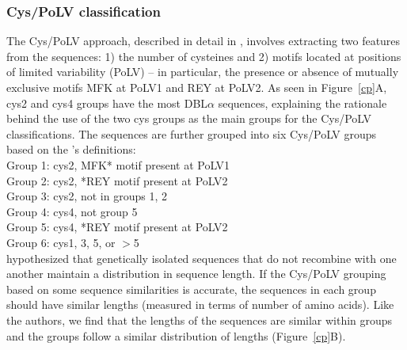 \documentclass[10pt,twocolumn,superscriptaddress]{revtex4-1}
\newcommand{\dbla}{{DBL$\alpha$}\xspace}
\newcommand{\cp}{{Cys/PoLV}\xspace}
\newcommand{\figdir}{figures/}
\begin{document}


\subsubsection{\cp classification}
The \cp approach, described in detail in \cite{bull2007}, involves extracting two features from the sequences: 1) the number of cysteines and 2) motifs located at positions of limited variability (PoLV) -- in particular, the presence or absence of mutually exclusive motifs MFK at PoLV1 and REY at PoLV2. As seen in Figure~\ref{cp}A, cys2 and cys4 groups have the most \dbla sequences, explaining the rationale behind the use of the two cys groups as the main groups for the \cp classifications. The sequences are further grouped into six \cp groups based on the \cite{bull2007}'s definitions:  \\

\noindent Group 1: cys2, MFK* motif present at PoLV1  \\
Group 2: cys2, *REY motif present at PoLV2   \\
Group 3: cys2, not in groups 1, 2   \\
Group 4: cys4, not group 5   \\
Group 5: cys4, *REY motif present at PoLV2  \\
Group 6: cys1, 3, 5, or $>$5  \\

\cite{bull2007} hypothesized that genetically isolated sequences that do not recombine with one another maintain a distribution in sequence length. If the \cp grouping based on some sequence similarities is accurate, the sequences in each group should have similar lengths (measured in terms of number of amino acids). Like the authors, we find that the lengths of the sequences are similar within groups and the groups follow a similar distribution of lengths (Figure~\ref{cp}B).   


\end{document}
